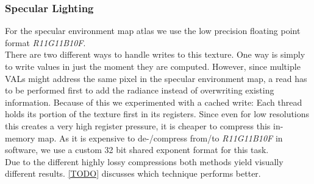 \documentclass[thesis.tex]{subfiles}
\begin{document}
\subsubsection{Specular Lighting} \label{sec:impl:details:specular}
For the specular environment map atlas we use the low precision floating point format \emph{R11G11B10F}.
\\
There are two different ways to handle writes to this texture.
One way is simply to write values in just the moment they are computed.
However, since multiple VALs might address the same pixel in the specular environment map, a read has to be performed first to add the radiance instead of overwriting existing information.
Because of this we experimented with a cached write:
Each thread holds its portion of the texture first in its registers.
Since even for low resolutions this creates a very high register pressure, it is cheaper to compress this in-memory map.
As it is expensive to de-/compress from/to \emph{R11G11B10F} in software, we use a custom 32 bit shared exponent format for this task.
\\
Due to the different highly lossy compressions both methods yield visually different results.
\autoref{TODO}  discusses which technique performs better.


\subfilebib %
\end{document}
